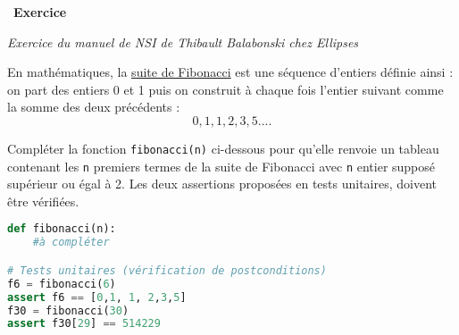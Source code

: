 \documentclass[
  10pt,
]{article}
\newcommand{\passthrough}[1]{#1}
\newcounter{exo}
\newenvironment{exercice}[1]
{\par \medskip   \addtocounter{exo}{1} \noindent  
\begin{bclogo}[arrondi =0.1,   noborder = true, logo=\bccrayon, marge=4]{~\textbf{Exercice} \textbf{\theexo} {\itshape #1} }  \par}
{
\end{bclogo}
 \par \bigskip }
\newcounter{thme}
\newcounter{prop}
\newcounter{def}
\begin{document}
\begin{exercice}{}

\emph{Exercice du manuel de NSI de Thibault Balabonski chez Ellipses}

En mathématiques, la
\href{http://images.math.cnrs.fr/Mysteres-arithmetiques-de-la-suite-de-Fibonacci.html}{suite
de Fibonacci} est une séquence d'entiers définie ainsi : on part des
entiers 0 et 1 puis on construit à chaque fois l'entier suivant comme la
somme des deux précédents : \[0, 1, 1, 2, 3, 5 ....\]

Compléter la fonction \passthrough{\lstinline!fibonacci(n)!} ci-dessous
pour qu'elle renvoie un tableau contenant les
\passthrough{\lstinline!n!} premiers termes de la suite de Fibonacci
avec \passthrough{\lstinline!n!} entier supposé supérieur ou égal à 2.
Les deux assertions proposées en tests unitaires, doivent être
vérifiées.

\begin{lstlisting}[language=Python]
def fibonacci(n):
    #à compléter

# Tests unitaires (vérification de postconditions)
f6 = fibonacci(6)
assert f6 == [0,1, 1, 2,3,5]
f30 = fibonacci(30)
assert f30[29] == 514229
\end{lstlisting}

\end{exercice}
\end{document}
